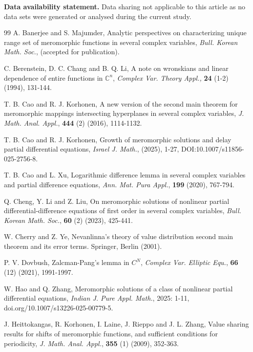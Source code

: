 \documentclass[11pt,reqno]{amsart}
\numberwithin{equation}{section}
\begin{document}
{\bf Data availability statement.} Data sharing not applicable to this article as no data sets were generated or analysed during the current study.


\begin{thebibliography}{99}
 {\sc A. Banerjee} and {\sc S. Majumder}, Analytic perspectives on characterizing unique range set of meromorphic functions in several complex variables, \textit{Bull. Korean Math. Soc.}, (accepted for publication).

 {\sc C. Berenstein}, {\sc D. C. Chang} and {\sc B. Q. Li}, A note on wronskians and linear dependence of entire functions in $\mathbb{C}^n$, \textit{Complex Var. Theory Appl.,} \textbf{24} (1-2) (1994), 131-144.

 {\sc T. B. Cao} and {\sc R. J. Korhonen}, A new version of the second main theorem for meromorphic mappings intersecting hyperplanes in several complex variables, \textit{J. Math. Anal. Appl.}, \textbf{444} (2) (2016), 1114-1132.

 {\sc T. B. Cao} and {\sc R. J. Korhonen}, Growth of meromorphic solutions and delay partial differential equations, \textit{Israel J. Math.}, (2025), 1-27, DOI:10.1007/s11856-025-2756-8.

 {\sc T. B. Cao} and {\sc L. Xu}, Logarithmic difference lemma in several complex variables and partial difference equations, \textit{Ann. Mat. Pura Appl.}, \textbf{199} (2020), 767-794.

 {\sc Q. Cheng}, {\sc Y. Li} and {\sc Z. Liu}, On meromorphic solutions of nonlinear partial differential-difference equations of first order in several complex variables, \textit{Bull. Korean Math. Soc.}, \textbf{60} (2) (2023), 425-441.

 {\sc W. Cherry} and  {\sc Z. Ye}, Nevanlinna's theory of value distribution second main theorem and its error terms. Springer, Berlin (2001).

 {\sc P. V. Dovbush}, Zalcman-Pang's lemma in $C^N$, \textit{Complex Var. Elliptic Equ.}, \textbf{66} (12) (2021), 1991-1997.

 {\sc W. Hao} and {\sc Q. Zhang}, Meromorphic solutions of a class of nonlinear partial differential equations, \textit{Indian J. Pure Appl. Math.}, 2025: 1-11, doi.org/10.1007/s13226-025-00779-5.

 {\sc J. Heittokangas}, {\sc R. Korhonen}, {\sc I. Laine}, {\sc J. Rieppo}
and {\sc J. L. Zhang}, Value sharing results for shifts of meromorphic functions, and sufficient conditions for periodicity, \textit{J. Math. Anal. Appl.}, \textbf{355} (1) (2009), 352-363.


\end{thebibliography}
\end{document}
